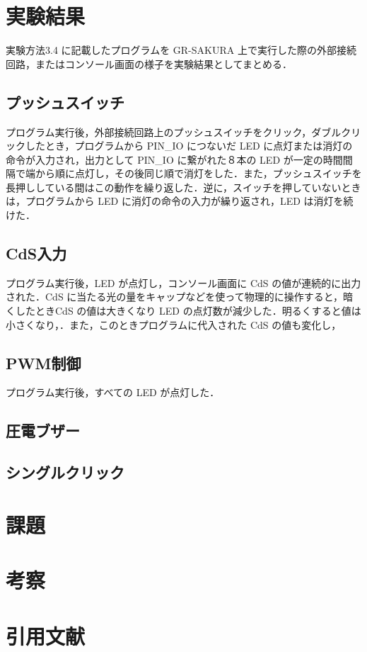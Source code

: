 \documentclass {ujarticle}
\begin{document}
 \section{実験結果}
 実験方法3.4 に記載したプログラムを GR-SAKURA 上で実行した際の外部接続回路，またはコンソール画面の様子を実験結果としてまとめる．
 \subsection{プッシュスイッチ}
 プログラム実行後，外部接続回路上のプッシュスイッチをクリック，ダブルクリックしたとき，プログラムから PIN\_IO につないだ LED に点灯または消灯の命令が入力され，出力として PIN\_IO に繋がれた８本の LED が一定の時間間隔で端から順に点灯し，その後同じ順で消灯をした．また，プッシュスイッチを長押ししている間はこの動作を繰り返した．逆に，スイッチを押していないときは，プログラムから LED に消灯の命令の入力が繰り返され，LED は消灯を続けた．
 
\subsection{CdS入力}
プログラム実行後，LED が点灯し，コンソール画面に CdS の値が連続的に出力された．CdS に当たる光の量をキャップなどを使って物理的に操作すると，暗くしたときCdS の値は大きくなり LED の点灯数が減少した．明るくすると値は小さくなり，．また，このときプログラムに代入された CdS の値も変化し，

\subsection{PWM制御}
 プログラム実行後，すべての LED が点灯した．
 
 \subsection{圧電ブザー}
 
 \subsection{シングルクリック}
 
 
 
 
 \section{課題}
 
 \section{考察}
 
 \section{引用文献}
 
 
 
 
 
 
 
 
 
 
 
 
 
 
 
 
 
 
 
 
 
 
 
 
\end{document}
